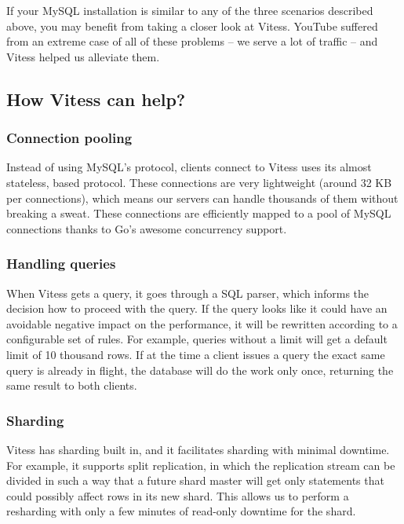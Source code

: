 If your MySQL installation is similar to any of the three scenarios described
above, you may benefit from taking a closer look at Vitess. YouTube suffered
from an extreme case of all of these problems – we serve a lot of traffic – and
Vitess helped us alleviate them.

\subsection{How Vitess can help?}\hypertarget{how-vitess-can-help}{}\label{how-vitess-can-help}

\subsubsection{Connection pooling}\hypertarget{connection-pooling}{}\label{connection-pooling}

Instead of using MySQL’s protocol, clients connect to Vitess uses its almost
stateless,  based protocol. These connections are very lightweight (around
32 KB per connections), which means our servers can handle thousands of them
without breaking a sweat. These connections are efficiently mapped to a pool of
MySQL connections thanks to Go’s awesome concurrency support.

\subsubsection{Handling queries}\hypertarget{handling-queries}{}\label{handling-queries}

When Vitess gets a query, it goes through a SQL parser, which informs the
decision how to proceed with the query. If the query looks like it could have an
avoidable negative impact on the performance, it will be rewritten according to
a configurable set of rules. For example, queries without a limit will get a
default limit of 10 thousand rows. If at the time a client issues a query the
exact same query is already in flight, the database will do the work only once,
returning the same result to both clients.

\subsubsection{Sharding}\hypertarget{sharding}{}\label{sharding}

Vitess has sharding built in, and it facilitates sharding with minimal downtime.
For example, it supports split replication, in which the replication stream can
be divided in such a way that a future shard master will get only statements
that could possibly affect rows in its new shard. This allows us to perform a
resharding with only a few minutes of read-only downtime for the shard.

